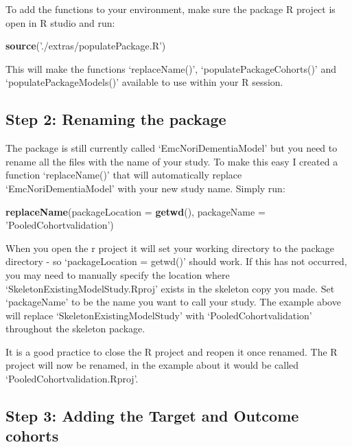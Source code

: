 \documentclass[
]{article}
\newenvironment{Shaded}{\begin{snugshade}}{\end{snugshade}}
\newcommand{\DataTypeTok}[1]{\textcolor[rgb]{0.13,0.29,0.53}{#1}}
\newcommand{\KeywordTok}[1]{\textcolor[rgb]{0.13,0.29,0.53}{\textbf{#1}}}
\newcommand{\NormalTok}[1]{#1}
\newcommand{\StringTok}[1]{\textcolor[rgb]{0.31,0.60,0.02}{#1}}
\begin{document}
To add the functions to your environment, make sure the package R
project is open in R studio and run:

\begin{Shaded}
\begin{Highlighting}[]
\KeywordTok{source}\NormalTok{(}\StringTok{'./extras/populatePackage.R'}\NormalTok{)}
\end{Highlighting}
\end{Shaded}

This will make the functions `replaceName()', `populatePackageCohorts()'
and `populatePackageModels()' available to use within your R session.

\hypertarget{step-2-renaming-the-package}{%
\subsection{Step 2: Renaming the
package}\label{step-2-renaming-the-package}}

The package is still currently called
`EmcNoriDementiaModel' but you need to rename all the
files with the name of your study. To make this easy I created a
function `replaceName()' that will automatically replace
`EmcNoriDementiaModel' with your new study name. Simply
run:

\begin{Shaded}
\begin{Highlighting}[]
\KeywordTok{replaceName}\NormalTok{(}\DataTypeTok{packageLocation =} \KeywordTok{getwd}\NormalTok{(), }
          \DataTypeTok{packageName =} \StringTok{'PooledCohortvalidation'}\NormalTok{)}
\end{Highlighting}
\end{Shaded}

When you open the r project it will set your working directory to the
package directory - so `packageLocation = getwd()' should work. If this
has not occurred, you may need to manually specify the location where
`SkeletonExistingModelStudy.Rproj' exists in the skeleton copy you made.
Set `packageName' to be the name you want to call your study. The
example above will replace `SkeletonExistingModelStudy' with
`PooledCohortvalidation' throughout the skeleton package.

It is a good practice to close the R project and reopen it once renamed.
The R project will now be renamed, in the example about it would be
called `PooledCohortvalidation.Rproj'.

\hypertarget{step-3-adding-the-target-and-outcome-cohorts}{%
\subsection{Step 3: Adding the Target and Outcome
cohorts}\label{step-3-adding-the-target-and-outcome-cohorts}}
\end{document}
